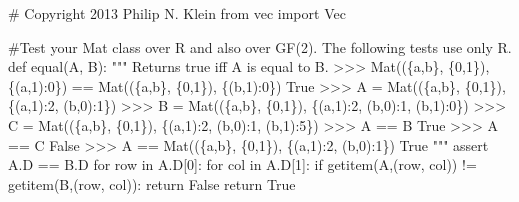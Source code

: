 \documentclass[
  letterpaper,
  DIV=11,
  numbers=noendperiod]{scrartcl}
\newenvironment{Shaded}{\begin{snugshade}}{\end{snugshade}}
\newcommand{\CommentTok}[1]{\textcolor[rgb]{0.37,0.37,0.37}{#1}}
\newcommand{\ControlFlowTok}[1]{\textcolor[rgb]{0.00,0.23,0.31}{#1}}
\newcommand{\DecValTok}[1]{\textcolor[rgb]{0.68,0.00,0.00}{#1}}
\newcommand{\ImportTok}[1]{\textcolor[rgb]{0.00,0.46,0.62}{#1}}
\newcommand{\KeywordTok}[1]{\textcolor[rgb]{0.00,0.23,0.31}{#1}}
\newcommand{\NormalTok}[1]{\textcolor[rgb]{0.00,0.23,0.31}{#1}}
\newcommand{\OperatorTok}[1]{\textcolor[rgb]{0.37,0.37,0.37}{#1}}
\newcommand{\VariableTok}[1]{\textcolor[rgb]{0.07,0.07,0.07}{#1}}
\begin{document}
\begin{Shaded}
\begin{Highlighting}[numbers=left,,]
\CommentTok{\# Copyright 2013 Philip N. Klein}
\ImportTok{from}\NormalTok{ vec }\ImportTok{import}\NormalTok{ Vec}

\CommentTok{\#Test your Mat class over R and also over GF(2).  The following tests use only R.}
\KeywordTok{def}\NormalTok{ equal(A, B):}
    \CommentTok{"""}
\CommentTok{    Returns true iff A is equal to B.}
\CommentTok{    \textgreater{}\textgreater{}\textgreater{} Mat((\{\textquotesingle{}a\textquotesingle{},\textquotesingle{}b\textquotesingle{}\}, \{0,1\}), \{(\textquotesingle{}a\textquotesingle{},1):0\}) == Mat((\{\textquotesingle{}a\textquotesingle{},\textquotesingle{}b\textquotesingle{}\}, \{0,1\}), \{(\textquotesingle{}b\textquotesingle{},1):0\})}
\CommentTok{    True}
\CommentTok{    \textgreater{}\textgreater{}\textgreater{} A = Mat((\{\textquotesingle{}a\textquotesingle{},\textquotesingle{}b\textquotesingle{}\}, \{0,1\}), \{(\textquotesingle{}a\textquotesingle{},1):2, (\textquotesingle{}b\textquotesingle{},0):1\})}
\CommentTok{    \textgreater{}\textgreater{}\textgreater{} B = Mat((\{\textquotesingle{}a\textquotesingle{},\textquotesingle{}b\textquotesingle{}\}, \{0,1\}), \{(\textquotesingle{}a\textquotesingle{},1):2, (\textquotesingle{}b\textquotesingle{},0):1, (\textquotesingle{}b\textquotesingle{},1):0\})}
\CommentTok{    \textgreater{}\textgreater{}\textgreater{} C = Mat((\{\textquotesingle{}a\textquotesingle{},\textquotesingle{}b\textquotesingle{}\}, \{0,1\}), \{(\textquotesingle{}a\textquotesingle{},1):2, (\textquotesingle{}b\textquotesingle{},0):1, (\textquotesingle{}b\textquotesingle{},1):5\})}
\CommentTok{    \textgreater{}\textgreater{}\textgreater{} A == B}
\CommentTok{    True}
\CommentTok{    \textgreater{}\textgreater{}\textgreater{} A == C}
\CommentTok{    False}
\CommentTok{    \textgreater{}\textgreater{}\textgreater{} A == Mat((\{\textquotesingle{}a\textquotesingle{},\textquotesingle{}b\textquotesingle{}\}, \{0,1\}), \{(\textquotesingle{}a\textquotesingle{},1):2, (\textquotesingle{}b\textquotesingle{},0):1\})}
\CommentTok{    True}
\CommentTok{    """}
    \ControlFlowTok{assert}\NormalTok{ A.D }\OperatorTok{==}\NormalTok{ B.D}
    \ControlFlowTok{for}\NormalTok{ row }\KeywordTok{in}\NormalTok{ A.D[}\DecValTok{0}\NormalTok{]:}
        \ControlFlowTok{for}\NormalTok{ col }\KeywordTok{in}\NormalTok{ A.D[}\DecValTok{1}\NormalTok{]:}
            \ControlFlowTok{if}\NormalTok{ getitem(A,(row, col)) }\OperatorTok{!=}\NormalTok{ getitem(B,(row, col)): }
                \ControlFlowTok{return} \VariableTok{False}
    \ControlFlowTok{return} \VariableTok{True}
 

\end{Highlighting}
\end{Shaded}
\end{document}
